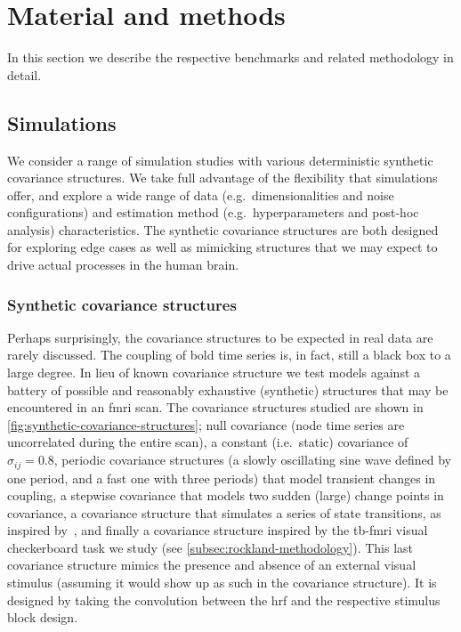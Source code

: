 \clearpage
\section{Material and methods}
\label{sec:simulations-methodology}

In this section we describe the respective benchmarks and related methodology in detail.

\subsection{Simulations}
\label{subsec:simulations-methods}

We consider a range of simulation studies with various deterministic synthetic covariance structures.
We take full advantage of the flexibility that simulations offer, and explore a wide range of data (e.g.~dimensionalities and noise configurations) and estimation method (e.g.~hyperparameters and post-hoc analysis) characteristics.
The synthetic covariance structures are both designed for exploring edge cases as well as mimicking structures that we may expect to drive actual processes in the human brain.

\subsubsection{Synthetic covariance structures}
\label{subsec:synthetic-covariance-structures}

Perhaps surprisingly, the covariance structures to be expected in real data are rarely discussed.
The coupling of \gls{bold} time series is, in fact, still a black box to a large degree.
In lieu of known covariance structure we test models against a battery of possible and reasonably exhaustive (synthetic) structures that may be encountered in an \gls{fmri} scan.
The covariance structures studied are shown in \cref{fig:synthetic-covariance-structures};
null covariance (node time series are uncorrelated during the entire scan),
a constant (i.e.~static) covariance of $\sigma_{ij} = 0.8$,
periodic covariance structures (a slowly oscillating sine wave defined by one period, and a fast one with three periods) that model transient changes in coupling,
a stepwise covariance that models two sudden (large) change points in covariance,
a covariance structure that simulates a series of state transitions, as inspired by~\textcite{Thompson2018},
and finally a covariance structure inspired by the \gls{tb-fmri} visual checkerboard task we study (see \cref{subsec:rockland-methodology}).
This last covariance structure mimics the presence and absence of an external visual stimulus (assuming it would show up as such in the covariance structure).
It is designed by taking the convolution between the \gls{hrf} and the respective stimulus block design.


